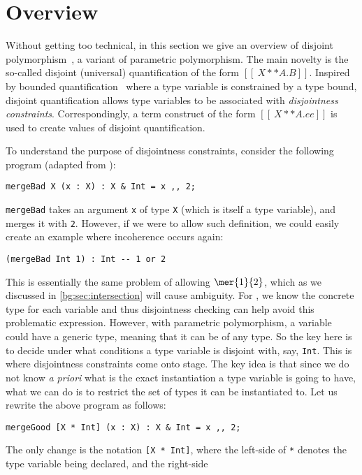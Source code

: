 
\section{Overview}

Without getting too technical, in this section we give an overview of
disjoint polymorphism~\citep{alpuimdisjoint}, a variant of parametric polymorphism. The main novelty
is the so-called disjoint (universal) quantification of the form
$[[ \ X ** A . B ]]$. Inspired by bounded quantification~\citep{cardelli1994extension} where a
type variable is constrained by a type bound, disjoint quantification allows
type variables to be associated with \textit{disjointness constraints}. Correspondingly, a
term construct of the form $[[ \ X ** A. ee ]]$ is used to create values of
disjoint quantification.

To understand the purpose of disjointness constraints, consider the following program (adapted from \citet{alpuimdisjoint}):
\begin{lstlisting}
mergeBad X (x : X) : X & Int = x ,, 2;
\end{lstlisting}
\lstinline{mergeBad} takes an argument \lstinline{x} of type \lstinline{X} (which is itself a type variable), and merges it with \lstinline{2}.
However, if we were to allow such definition, we could easily create an example where incoherence occurs again:
\begin{lstlisting}
(mergeBad Int 1) : Int -- 1 or 2
\end{lstlisting}
This is essentially the same problem of allowing $\mer{1}{2}$, which as we
discussed in \cref{bg:sec:intersection} will cause ambiguity. For \namee, we
know the concrete type for each variable and thus disjointness checking can help
avoid this problematic expression. However, with parametric polymorphism, a variable
could have a generic type, meaning that it can be of any type. So the key here
is to decide under what conditions a type variable is disjoint with, say,
\lstinline{Int}. This is where disjointness constraints come onto stage. The key idea
is that since we do not know \textit{a priori} what is the exact instantiation a
type variable is going to have, what we can do is to restrict the set of types
it can be instantiated to. Let us rewrite the above program as follows:
\begin{lstlisting}
mergeGood [X * Int] (x : X) : X & Int = x ,, 2;
\end{lstlisting}
The only change is the notation \lstinline{[X * Int]}, where the left-side of
\lstinline{*} denotes the type variable being declared, and the right-side
